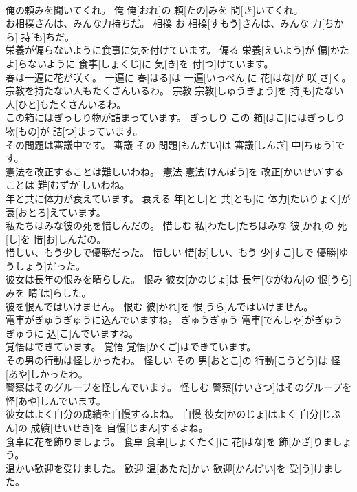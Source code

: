 \documentclass[8pt]{extreport}
\begin{document}
\begin{CJK}{UTF8}{min}
\\	俺の頼みを聞いてくれ。	俺	俺[おれ]の 頼[たの]みを 聞[き]いてくれ。	
\\	お相撲さんは、みんな力持ちだ。	相撲	お 相撲[すもう]さんは、みんな 力[ちから] 持[も]ちだ。	
\\	栄養が偏らないように食事に気を付けています。	偏る	栄養[えいよう]が 偏[かたよ]らないように 食事[しょくじ]に 気[き]を 付[つ]けています。	
\\	春は一遍に花が咲く。	一遍に	春[はる]は 一遍[いっぺん]に 花[はな]が 咲[さ]く。	
\\	宗教を持たない人もたくさんいるわ。	宗教	宗教[しゅうきょう]を 持[も]たない 人[ひと]もたくさんいるわ。	
\\	この箱にはぎっしり物が詰まっています。	ぎっしり	この 箱[はこ]にはぎっしり 物[もの]が 詰[つ]まっています。	
\\	その問題は審議中です。	審議	その 問題[もんだい]は 審議[しんぎ] 中[ちゅう]です。	
\\	憲法を改正することは難しいわね。	憲法	憲法[けんぽう]を 改正[かいせい]することは 難[むずか]しいわね。	
\\	年と共に体力が衰えています。	衰える	年[とし]と 共[とも]に 体力[たいりょく]が 衰[おとろ]えています。	
\\	私たちはみな彼の死を惜しんだの。	惜しむ	私[わたし]たちはみな 彼[かれ]の 死[し]を 惜[お]しんだの。	
\\	惜しい、もう少しで優勝だった。	惜しい	惜[お]しい、もう 少[すこ]しで 優勝[ゆうしょう]だった。	
\\	彼女は長年の恨みを晴らした。	恨み	彼女[かのじょ]は 長年[ながねん]の 恨[うら]みを 晴[は]らした。	
\\	彼を恨んではいけません。	恨む	彼[かれ]を 恨[うら]んではいけません。	
\\	電車がぎゅうぎゅうに込んでいますね。	ぎゅうぎゅう	電車[でんしゃ]がぎゅうぎゅうに 込[こ]んでいますね。	
\\	覚悟はできています。	覚悟	覚悟[かくご]はできています。	
\\	その男の行動は怪しかったわ。	怪しい	その 男[おとこ]の 行動[こうどう]は 怪[あや]しかったわ。	
\\	警察はそのグループを怪しんでいます。	怪しむ	警察[けいさつ]はそのグループを 怪[あや]しんでいます。	
\\	彼女はよく自分の成績を自慢するよね。	自慢	彼女[かのじょ]はよく 自分[じぶん]の 成績[せいせき]を 自慢[じまん]するよね。	
\\	食卓に花を飾りましょう。	食卓	食卓[しょくたく]に 花[はな]を 飾[かざ]りましょう。	
\\	温かい歓迎を受けました。	歓迎	温[あたた]かい 歓迎[かんげい]を 受[う]けました。	

\end{CJK}
\end{document}
